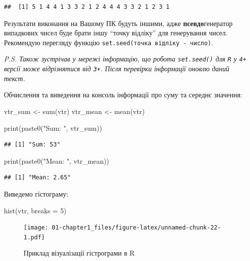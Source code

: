 \documentclass[
]{book}
\newenvironment{Shaded}{\begin{snugshade}}{\end{snugshade}}
\newcommand{\AttributeTok}[1]{\textcolor[rgb]{0.77,0.63,0.00}{#1}}
\newcommand{\DecValTok}[1]{\textcolor[rgb]{0.00,0.00,0.81}{#1}}
\newcommand{\FunctionTok}[1]{\textcolor[rgb]{0.00,0.00,0.00}{#1}}
\newcommand{\NormalTok}[1]{#1}
\newcommand{\OtherTok}[1]{\textcolor[rgb]{0.56,0.35,0.01}{#1}}
\newcommand{\StringTok}[1]{\textcolor[rgb]{0.31,0.60,0.02}{#1}}
\begin{document}
\begin{verbatim}
##  [1] 5 1 4 4 1 3 3 2 1 2 4 4 4 3 3 2 1 2 3 1
\end{verbatim}

Результати виконання на Вашому ПК будуть іншими, адже \textbf{псевдо}генератор випадкових чисел буде брати іншу ``точку відліку'' для генерування чисел. Рекомендую перегляду функцію \texttt{set.seed(точка\ відліку\ -\ число)}.

\emph{P.S. Також зустрічав у мережі інформацію, що робота \texttt{set.seed()} для \texttt{R} у \texttt{4+} версії може відрізнятися від \texttt{3+}. Після перевірки інформації оновлю даний текст.}

Обчислення та виведення на консоль інформації про суму та середнє значення:

\begin{Shaded}
\begin{Highlighting}[]
\NormalTok{vtr\_sum }\OtherTok{\textless{}{-}} \FunctionTok{sum}\NormalTok{(vtr)}
\NormalTok{vtr\_mean }\OtherTok{\textless{}{-}} \FunctionTok{mean}\NormalTok{(vtr)}

\FunctionTok{print}\NormalTok{(}\FunctionTok{paste0}\NormalTok{(}\StringTok{"Sum: "}\NormalTok{, vtr\_sum))}
\end{Highlighting}
\end{Shaded}

\begin{verbatim}
## [1] "Sum: 53"
\end{verbatim}

\begin{Shaded}
\begin{Highlighting}[]
\FunctionTok{print}\NormalTok{(}\FunctionTok{paste0}\NormalTok{(}\StringTok{"Mean: "}\NormalTok{, vtr\_mean))}
\end{Highlighting}
\end{Shaded}

\begin{verbatim}
## [1] "Mean: 2.65"
\end{verbatim}

Виведемо гістограму:

\begin{Shaded}
\begin{Highlighting}[]
\FunctionTok{hist}\NormalTok{(vtr, }\AttributeTok{breaks =} \DecValTok{5}\NormalTok{)}
\end{Highlighting}
\end{Shaded}

\begin{figure}
\centering
\texttt{[image: 01-chapter1\_files/figure-latex/unnamed-chunk-22-1.pdf]}
\caption{\label{fig:unnamed-chunk-22}Приклад візуалізації гістрограми в R}
\end{figure}
\end{document}
